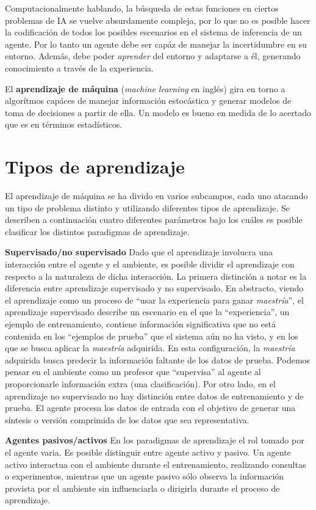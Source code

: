 Computacionalmente hablando, la búsqueda de estas funciones en ciertos problemas de IA
se vuelve absurdamente compleja, por lo que no es posible hacer la codificación de todos
los posibles escenarios en el sistema de inferencia de un agente. Por lo tanto un agente
debe ser capáz de manejar la incertidumbre en su entorno. Además, debe poder \textit{aprender}
del entorno y adaptarse a él, generando conocimiento a través de la experiencia.

El \textbf{aprendizaje de máquina} (\textit{machine learning} en inglés) gira en torno a
algorítmos capáces de manejar información estocástica y generar modelos de toma de decisiones
a partir de ella. Un modelo es bueno en medida de lo acertado que es en términos estadísticos.

\section{Tipos de aprendizaje}
El aprendizaje de máquina se ha divido en varios subcampos,
cada uno atacando un tipo de problema distinto y utilizando diferentes
tipos de aprendizaje.
Se describen a continuación cuatro diferentes parámetros bajo los cuáles
es posible clasificar los distintos paradigmas de aprendizaje.

\textbf{Supervisado/no supervisado} Dado que el aprendizaje involucra
una interacción entre el agente y el ambiente, es posible
dividir el aprendizaje con respecto a la naturaleza de dicha interacción.
La primera distinción a notar es la diferencia entre aprendizaje supervisado
y no supervisado. En abstracto, viendo el aprendizaje como un proceso
de ``usar la experiencia para ganar \textit{maestría}'', el aprendizaje
supervisado describe un escenario en el que la ``experiencia'', un
ejemplo de entrenamiento, contiene información significativa que no
está contenida en los ``ejemplos de prueba'' que el sistema aún no ha
visto, y en los que se busca aplicar la \textit{maestría} adquirida.
En esta configuración, la \textit{maestría} adquirida busca
predecir la información faltante de los datos de prueba. Podemos
pensar en el ambiente como un profesor que ``supervisa'' al agente
al proporcionarle información extra (una clasificación). Por otro lado,
en el aprendizaje no supervisado no hay distinción entre datos de
entrenamiento y de prueba. El agente procesa los datos de entrada
con el objetivo de generar una síntesis o versión comprimida de los
datos que sea representativa.

\textbf{Agentes pasivos/activos} En los paradigmas de aprendizaje
el rol tomado por el agente varia. Es posible distinguir entre
agente activo y pasivo. Un agente activo interactua
con el ambiente durante el entrenamiento, realizando consultas o
experimentos, mientras que un agente pasivo sólo observa la
información provista por el ambiente sin influenciarla
o dirigirla durante el proceso de aprendizaje.

